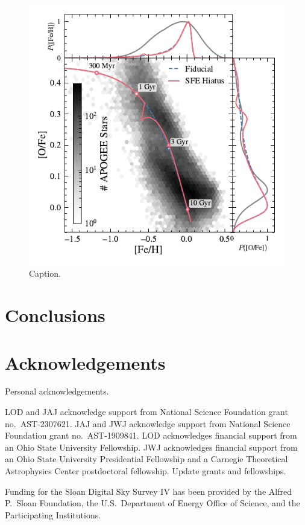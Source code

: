 \documentclass[twocolumn,twocolappendix,linenumbers]{aastex631}
\newcommand{\todo}[1]{{\color{red}#1}}
\begin{document}
\begin{figure}
    \centering
    \includegraphics{figures/onezone_sfe_hiatus.pdf}
    \caption{Caption.}
    \label{fig:onezone-sfe-hiatus}
\end{figure}

\section{Conclusions}
\label{sec:conclusions}

\section*{Acknowledgements}

\todo{Personal acknowledgements.}

LOD and JAJ acknowledge support from National Science Foundation grant no.\ AST-2307621. JAJ and JWJ acknowledge support from National Science Foundation grant no.\ AST-1909841.
LOD acknowledges financial support from an Ohio State University Fellowship.
JWJ acknowledges financial support from an Ohio State University Presidential Fellowship and a Carnegie Theoretical Astrophysics Center postdoctoral fellowship. \todo{Update grants and fellowships.}

Funding for the Sloan Digital Sky 
Survey IV has been provided by the 
Alfred P.\ Sloan Foundation, the U.S.\ 
Department of Energy Office of 
Science, and the Participating 
Institutions. 
\end{document}
